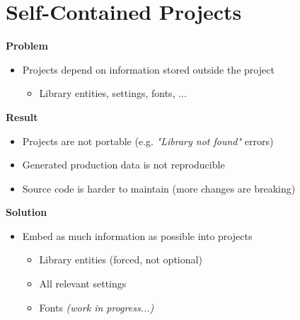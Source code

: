 \section{Self-Contained Projects}

\begin{frame}{\secname}
  \textbf{Problem}
  \begin{itemize}
    \item Projects depend on information stored outside the project
    \begin{itemize}
      \item Library entities, settings, fonts, ...
    \end{itemize}
  \end{itemize}
  
  \pause
  
  \textbf{Result}
  \begin{itemize}
    \item Projects are not portable (e.g. \textit{"Library not found"} errors)
    \item Generated production data is not reproducible
    \item Source code is harder to maintain (more changes are breaking)
  \end{itemize}
  
  \pause
  
  \textbf{Solution}
  \begin{itemize}
    \item Embed as much information as possible into projects
    \begin{itemize}
      \item Library entities (forced, not optional)
      \item All relevant settings
      \item Fonts \textit{(work in progress...)}
    \end{itemize}
  \end{itemize}
\end{frame}